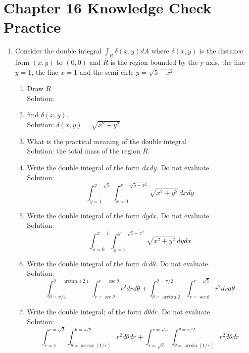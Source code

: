 \documentclass[11pt]{article}
\begin{document}
\section{Chapter 16 Knowledge Check Practice}
\begin{enumerate}
  \item  Consider the double integral $\int_R \delta(x,y) dA$ where $\delta(x,y)$ is the distance from $(x,y)$ to $(0,0)$ and $R$ is the region bounded by the y-axis, the line $y=1$, the line $x=1$ and the semi-cirle $y=\sqrt{5-x^2}$
    \renewcommand{\theenumi}{\Alph{enumi}}
  \begin{enumerate}
    \item Draw $R$\\
      Solution: 
    \item find $\delta(x,y)$.\\
      Solution: $\delta(x,y) = \sqrt{x^2+y^2}$
    \item What is the practical meaning of the double integral\\
      Solution: the total mass of the region $R$.
    \item Write the double integral of the form $dxdy$. Do not evaluate.\\
      Solution: \[\int_{y=1}^{y=\sqrt{5}} \int_{x=0}^{x=\sqrt{5-x^2}} \sqrt{x^2+y^2} \, dx dy\]
    \item Write the double integral of the form $dydx$. Do not evaluate.\\
      Solution: \[\int_{x=0}^{x=1} \int_{y=1}^{y=\sqrt{5-x^2}} \sqrt{x^2+y^2} \, dy dx\]
    \item Write the double integral of the form $drd\theta$. Do not evaluate.\\
      Solution: \[\int_{\theta=\pi/4}^{\theta=\arctan(2)} \int_{r=\sec\theta}^{r=\csc\theta} r^2 dr d\theta + \int_{\theta=\arctan 2}^{\theta=\pi/2} \int_{r=\sec\theta}^{r=\sqrt{5}} r^2 dr d\theta\]
      \item Write the double integral; of the form $d\theta dr$. Do not evaluate.\\
        Solution: \[\int_{r=1}^{r=\sqrt{2}} \int_{\theta=\arccos(1/r)}^{\theta=\pi/2} r^2 d\theta dr + \int_{r=\sqrt{2}}^{r=\sqrt{5}} \int_{\theta=\arcsin(1/r)}^{\theta=\pi/2} r^2 d\theta dr\]
  \end{enumerate}
\end{enumerate}
\end{document}
